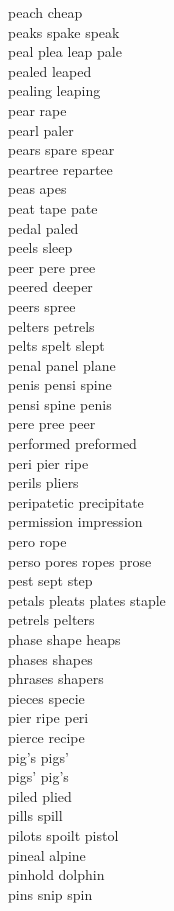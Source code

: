 peach cheap\\
peaks spake speak\\
peal plea leap pale\\
pealed leaped\\
pealing leaping\\
pear rape\\
pearl paler\\
pears spare spear\\
peartree repartee\\
peas apes\\
peat tape pate\\
pedal paled\\
peels sleep\\
peer pere pree\\
peered deeper\\
peers spree\\
pelters petrels\\
pelts spelt slept\\
penal panel plane\\
penis pensi spine\\
pensi spine penis\\
pere pree peer\\
performed preformed\\
peri pier ripe\\
perils pliers\\
peripatetic precipitate\\
permission impression\\
pero rope\\
perso pores ropes prose\\
pest sept step\\
petals pleats plates staple\\
petrels pelters\\
phase shape heaps\\
phases shapes\\
phrases shapers\\
pieces specie\\
pier ripe peri\\
pierce recipe\\
pig's pigs'\\
pigs' pig's\\
piled plied\\
pills spill\\
pilots spoilt pistol\\
pineal alpine\\
pinhold dolphin\\
pins snip spin\\
